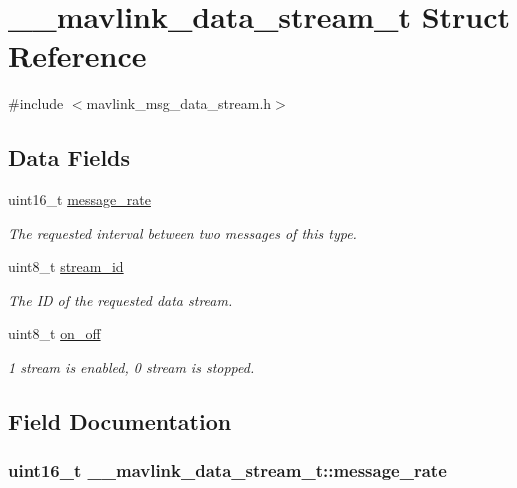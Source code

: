 \hypertarget{struct____mavlink__data__stream__t}{\section{\+\_\+\+\_\+mavlink\+\_\+data\+\_\+stream\+\_\+t Struct Reference}
\label{struct____mavlink__data__stream__t}
}


{\ttfamily \#include $<$mavlink\+\_\+msg\+\_\+data\+\_\+stream.\+h$>$}

\subsection*{Data Fields}
\begin{DoxyCompactItemize}
\item 
uint16\+\_\+t \hyperlink{struct____mavlink__data__stream__t_a351a00b81ef679d4fa73048257494bbc}{message\+\_\+rate}
\begin{DoxyCompactList}\small\item\em The requested interval between two messages of this type. \end{DoxyCompactList}\item 
uint8\+\_\+t \hyperlink{struct____mavlink__data__stream__t_aaac4584f5e5677fe70edee1c53565b53}{stream\+\_\+id}
\begin{DoxyCompactList}\small\item\em The I\+D of the requested data stream. \end{DoxyCompactList}\item 
uint8\+\_\+t \hyperlink{struct____mavlink__data__stream__t_ae0ec7bd3a3fd38496e2a6aaa3b39daca}{on\+\_\+off}
\begin{DoxyCompactList}\small\item\em 1 stream is enabled, 0 stream is stopped. \end{DoxyCompactList}\end{DoxyCompactItemize}


\subsection{Field Documentation}
\hypertarget{struct____mavlink__data__stream__t_a351a00b81ef679d4fa73048257494bbc}{
\subsubsection[{message\+\_\+rate}]{\setlength{\rightskip}{0pt plus 5cm}uint16\+\_\+t \+\_\+\+\_\+mavlink\+\_\+data\+\_\+stream\+\_\+t\+::message\+\_\+rate}}\label{struct____mavlink__data__stream__t_a351a00b81ef679d4fa73048257494bbc}



